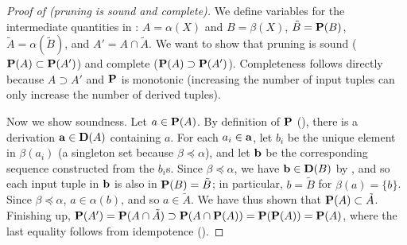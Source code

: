 \begin{proof}[Proof of  (pruning is sound and complete)]
We define variables for the intermediate quantities in :
$A = \alpha(X)$ and $B = \beta(X)$, $\tilde B = \mathbf{P}(B)$, $\tilde A = \alpha(\tilde B)$,
and $A' = A \cap \tilde A$.
We want to show that pruning is sound ($\mathbf{P}(A) \subset \mathbf{P}(A')$)
and complete ($\mathbf{P}(A) \supset \mathbf{P}(A')$).
Completeness follows directly because $A \supset A'$ and $\mathbf{P}$ is monotonic (increasing
the number of input tuples can only increase the number of derived tuples).

Now we show soundness.
Let $a \in \mathbf{P}(A)$.  By definition of $\mathbf{P}$ (), there is a derivation $\mathbf{a} \in \mathbf{D}(A)$ containing $a$.
For each $a_i \in \mathbf{a}$, let $b_i$ be the unique element in $\beta(a_i)$ (a singleton set because $\beta \preceq \alpha$),
and let $\mathbf{b}$ be the corresponding sequence constructed from the $b_i$s.
Since $\beta \preceq \alpha$, we have $\mathbf{b} \in \mathbf{D}(B)$ by ,
and so each input tuple in $\mathbf{b}$ is also in $\mathbf{P}(B) = \tilde B$;
in particular, $b = \tilde B$ for $\beta(a) = \{ b \}$.
Since $\beta \preceq \alpha$, $a \in \alpha(b)$, and so $a \in \tilde A$.
We have thus shown that $\mathbf{P}(A) \subset \tilde A$.
Finishing up, $\mathbf{P}(A') = \mathbf{P}(A \cap \tilde A) \supset \mathbf{P}(A \cap \mathbf{P}(A)) = \mathbf{P}(\mathbf{P}(A)) = \mathbf{P}(A)$,
where the last equality follows from idempotence ().
\end{proof}

